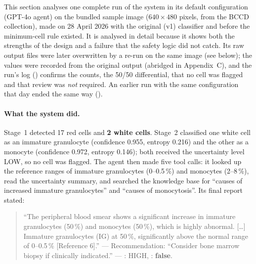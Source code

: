 This section analyses one complete run of the system in its default configuration (GPT-4o agent) on the bundled sample image  ($640 \times 480$ pixels, from the BCCD collection), made on 28 April 2026 with the original (v1) classifier and before the minimum-cell rule existed. It is analysed in detail because it shows both the strengths of the design and a failure that the safety logic did not catch. Its raw output files were later overwritten by a re-run on the same image (see below); the values were recorded from the original output (abridged in Appendix~C), and the run's log (\allowbreak\mbox{}) confirms the counts, the 50/50 differential, that no cell was flagged and that review was \emph{not} required. An earlier run with the same configuration that day ended the same way (\mbox{}).

\paragraph{What the system did.} Stage~1 detected 17 red cells and \textbf{2 white cells}. Stage~2 classified one white cell as an immature granulocyte (confidence 0.955, entropy 0.216) and the other as a monocyte (confidence 0.972, entropy 0.146); both received the uncertainty level LOW, so no cell was flagged. The agent then made five tool calls: it looked up the reference ranges of immature granulocytes (0--0.5\,\%) and monocytes (2--8\,\%), read the uncertainty summary, and searched the knowledge base for ``causes of increased immature granulocytes'' and ``causes of monocytosis''. Its final report stated:

\begin{quote}\small
``The peripheral blood smear shows a significant increase in immature granulocytes (50\,\%) and monocytes (50\,\%), which is highly abnormal. [\ldots] Immature granulocytes (IG) at 50\,\%, significantly above the normal range of 0--0.5\,\% [Reference 6].'' --- Recommendation: ``Consider bone marrow biopsy if clinically indicated.'' --- : HIGH, : \textbf{false}.
\end{quote}

